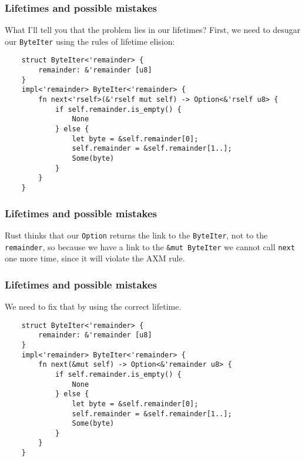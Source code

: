 \documentclass[aspectratio=1610,t]{beamer}
\begin{document}

\begin{frame}[fragile]
\frametitle{Lifetimes and possible mistakes}
What I'll tell you that the problem lies in our lifetimes? First, we need to desugar our \texttt{ByteIter} using the rules of lifetime elision:

\begin{verbatim}
    struct ByteIter<'remainder> {
        remainder: &'remainder [u8]
    }
    impl<'remainder> ByteIter<'remainder> {
        fn next<'rself>(&'rself mut self) -> Option<&'rself u8> {
            if self.remainder.is_empty() {
                None
            } else {
                let byte = &self.remainder[0];
                self.remainder = &self.remainder[1..];
                Some(byte)
            }
        }
    }
\end{verbatim}
\end{frame}


\begin{frame}[fragile]
\frametitle{Lifetimes and possible mistakes}
Rust thinks that our \texttt{Option} returns the link to the \texttt{ByteIter}, not to the \texttt{remainder}, so because we have a link to the \texttt{\&mut ByteIter} we cannot call \texttt{next} one more time, since it will violate the AXM rule.
\end{frame}


\begin{frame}[fragile]
\frametitle{Lifetimes and possible mistakes}
We need to fix that by using the correct lifetime.

\begin{verbatim}
    struct ByteIter<'remainder> {
        remainder: &'remainder [u8]
    }
    impl<'remainder> ByteIter<'remainder> {
        fn next(&mut self) -> Option<&'remainder u8> {
            if self.remainder.is_empty() {
                None
            } else {
                let byte = &self.remainder[0];
                self.remainder = &self.remainder[1..];
                Some(byte)
            }
        }
    }
\end{verbatim}
\end{frame}

\end{document}
